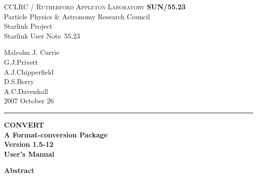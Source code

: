 \documentclass[twoside,11pt]{article}
\newcommand{\stardoccategory}  {Starlink User Note}
\newcommand{\stardocinitials}  {SUN}
\newcommand{\stardocnumber}    {55.23}
\newcommand{\stardocauthors}   {Malcolm J. Currie\\
                                G.J.Privett\\
                                A.J.Chipperfield\\
                                D.S.Berry\\
                                A.C.Davenhall}
\newcommand{\stardocdate}      {2007 October 26}
\newcommand{\stardoctitle}     {CONVERT\\
                                A Format-conversion Package}
\newcommand{\stardocversion}   {Version 1.5-12}
\newcommand{\stardocmanual}    {User's Manual}
\newcommand{\stardocname}{\stardocinitials /\stardocnumber}
\newenvironment{latexonly}{}{}
\begin{document}
\thispagestyle{empty}

\begin{latexonly}
   CCLRC / \textsc{Rutherford Appleton Laboratory} \hfill \textbf{\stardocname}\\
   {\large Particle Physics \& Astronomy Research Council}\\
   {\large Starlink Project\\}
   {\large \stardoccategory\ \stardocnumber}
   \begin{flushright}
   \stardocauthors\\
   \stardocdate
   \end{flushright}
   \vspace{-4mm}
   \rule{\textwidth}{0.5mm}
   \vspace{5mm}
   \begin{center}
   {\Huge\textbf{\stardoctitle \\ [2.5ex]}}
   {\LARGE\textbf{\stardocversion \\ [4ex]}}
   {\Huge\textbf{\stardocmanual}}
   \end{center}
   \vspace{5mm}


   \vspace{10mm}
   \begin{center}
      {\Large\textbf{Abstract}}
   \end{center}
\end{latexonly}
\end{document}
